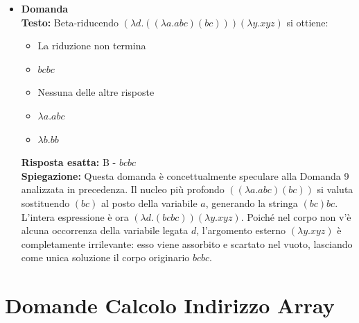 \documentclass[12pt, a4paper]{article}
\newcounter{domandateoria}
\begin{document}
\begin{itemize}
\item {}\textbf{Domanda \thedomandateoria} \\
\textbf{Testo:} Beta-riducendo $(\lambda d.((\lambda a.a b c)(b c))) (\lambda y.x y z)$ si ottiene:
\begin{itemize}
    \item[A)] La riduzione non termina
    \item[B)] $b c b c$
    \item[C)] Nessuna delle altre risposte
    \item[D)] $\lambda a.a b c$
    \item[E)] $\lambda b.b b$
\end{itemize}

\newpage

\textbf{Risposta esatta:} B - $b c b c$ \\
\textbf{Spiegazione:} Questa domanda è concettualmente speculare alla Domanda 9 analizzata in precedenza. Il nucleo più profondo $((\lambda a.a b c)(b c))$ si valuta sostituendo $(b c)$ al posto della variabile $a$, generando la stringa $(b c) b c$. L'intera espressione è ora $(\lambda d.(b c b c))(\lambda y.x y z)$. Poiché nel corpo non v'è alcuna occorrenza della variabile legata $d$, l'argomento esterno $(\lambda y.x y z)$ è completamente irrilevante: esso viene assorbito e scartato nel vuoto, lasciando come unica soluzione il corpo originario $b c b c$.
\vspace{0.3cm}


\end{itemize}

\section{Domande Calcolo Indirizzo Array}
\end{document}
